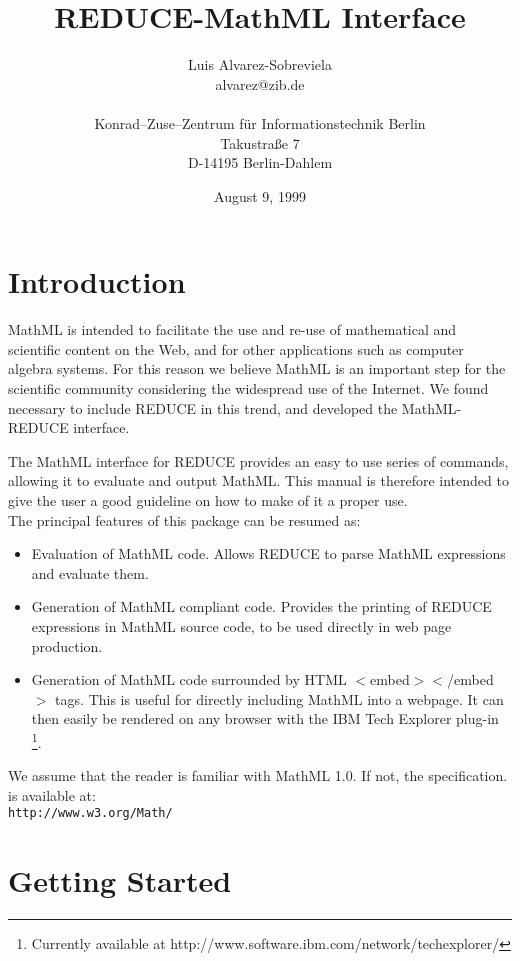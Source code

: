 \documentclass{article}
\title{REDUCE-MathML Interface}
\author{Luis Alvarez-Sobreviela \\ alvarez@zib.de \\ \\
	Konrad--Zuse--Zentrum f\"ur Informationstechnik Berlin \\
        Takustra\ss e 7 \\ D-14195 Berlin-Dahlem}
\date{August 9, 1999}
\begin{document}
\maketitle

\section{Introduction}

MathML is intended to facilitate the use and re-use of mathematical and
scientific content on the Web, and for other applications such as computer
algebra systems. For this reason we believe MathML is an important step
for the scientific community considering the widespread use of the
Internet. We found necessary to include REDUCE in this trend, and
developed the MathML-REDUCE interface.

The MathML interface for REDUCE provides an easy to use series of
commands, allowing it to evaluate and output MathML. This manual is
therefore intended to give the user a good guideline on how to make of it a
proper use. 
\\

The principal features of this package can be resumed as:  
\begin{itemize}
\item Evaluation of MathML code. Allows REDUCE to parse MathML expressions
and evaluate them. 
\item Generation of MathML compliant code. Provides the printing of REDUCE
expressions in MathML source code, to be used directly in web page
production. 

\item Generation of MathML code surrounded by HTML $<$embed$>$$<$/embed$>$
tags. This is useful for directly including MathML into a webpage. It can
then easily be rendered on any browser with the IBM Tech Explorer plug-in
\footnote{Currently available at
http://www.software.ibm.com/network/techexplorer/}. 

\end{itemize}

We assume that the reader is familiar with MathML 1.0. If not, the
specification. is available at: \\

{\tt http://www.w3.org/Math/ }

\section{Getting Started}
\end{document}
